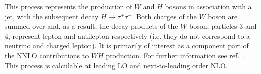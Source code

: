 This process represents the production of $W$ and $H$ bosons in
association with a jet, with the subsequent decay $H \to \tau^+ \tau^-$.
Both charges of the $W$ boson are summed over and, as a result, the
decay products of the $W$ boson, particles 3 and 4,
represent lepton and antilepton respectively (i.e. they do not correspond
to a neutrino and charged lepton).
It is primarily of interest as a component
part of the NNLO contributions to $WH$ production.
For further information see ref.~\cite{Campbell:2016jau}.
This process is calculable at leading LO and next-to-leading order NLO.
